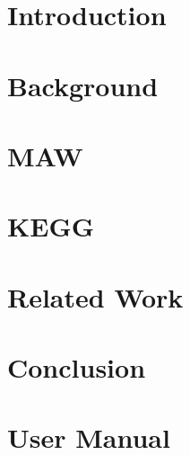 


\setcounter{page}{1}


\setcounter{tocdepth}{1}
\tableofcontents

{}
\listoftables

{}
\listoffigures

\doublespace

\pagebreak

\setcounter{page}{1}


\pagebreak

\chapter{Introduction}
\label{ch:introduction}


\chapter{Background}
\label{ch:background}


\chapter{MAW}
\label{ch:maw_smda}


\chapter{KEGG}
\label{ch:kegg}


\chapter{Related Work}
\label{ch:related_work}


\chapter{Conclusion}
\label{ch:conclusion}


\appendix

\chapter{\keggapp User Manual}
\label{ch:kegg_manual}







